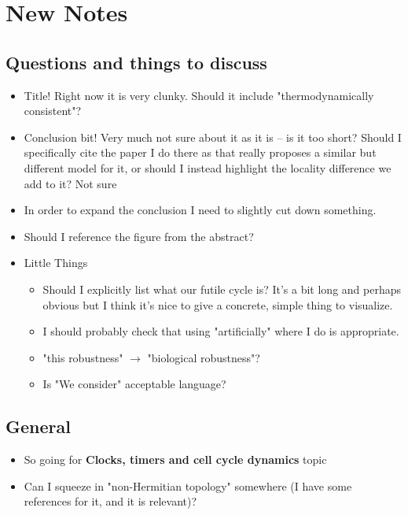 \documentclass[11pt]{article}
\begin{document}
\newpage
\printbibliography

\newpage
\section{New Notes}
\subsection{Questions and things to discuss}
\begin{itemize}
	\item Title! Right now it is very clunky. Should it include "thermodynamically consistent"?
    \item Conclusion bit! Very much not sure about it as it is -- is it too short? Should I specifically cite the paper I do there as that really proposes a similar but different model for it, or should I instead highlight the locality difference we add to it? Not sure
    \item In order to expand the conclusion I need to slightly cut down something.
	\item Should I reference the figure from the abstract?
	\item Little Things \begin{itemize}
		      \item Should I explicitly list what our futile cycle is? It's a bit long and perhaps obvious but I think it's nice to give a concrete, simple thing to visualize.
              \item I should probably check that using "artificially" where I do is appropriate.
              \item "this robustness" $\rightarrow$ "biological robustness"?
              \item Is "We consider" acceptable language?
	      \end{itemize}
\end{itemize}

\subsection{General}
\begin{itemize}
	\item So going for \textbf{Clocks, timers and cell cycle dynamics} topic
	\item Can I squeeze in "non-Hermitian topology" somewhere (I have some references for it, and it is relevant)?
\end{itemize}
\end{document}
